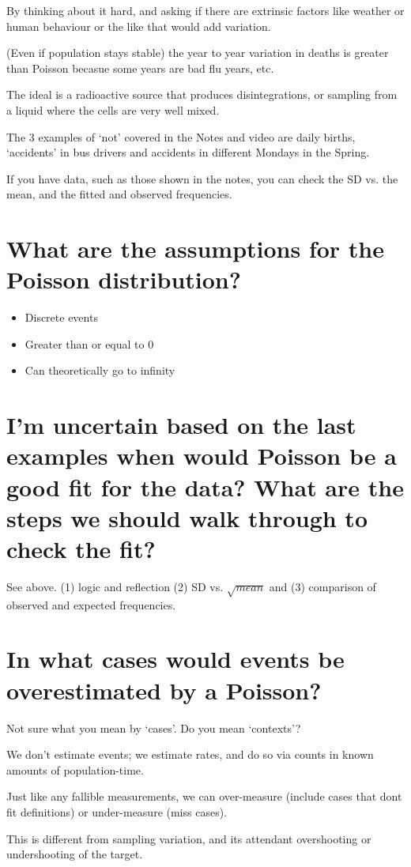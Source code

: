 \documentclass[landscape,twocolumn,letterpaper,9pt,reqno]{article}
\begin{document}
By thinking about it hard, and asking if there are extrinsic factors like weather or human behaviour or the like that would add variation.

(Even if population stays stable) the year to year variation in deaths is greater than Poisson becasue some years are bad flu years, etc. 

The ideal is a radioactive source that produces disintegrations, or sampling from a liquid where the cells are very well mixed.

The 3 examples of `not' covered in the Notes and video are daily births,
`accidents' in bus drivers and accidents in different Mondays in the Spring.

If you have data, such as those shown in the notes, you can check the SD vs. the mean, and the fitted and observed frequencies. 




\section{What are the assumptions for the Poisson distribution? }

\begin{itemize}
	\item Discrete events 
	\item Greater than or equal to 0
	\item Can theoretically go to infinity
\end{itemize}


\section{I'm uncertain based on the last examples when would Poisson be a good fit for the data? What are the steps we should walk through to check the fit?}

See above.  (1) logic and reflection (2) SD vs. $\sqrt{mean}$ and (3) comparison of observed and expected frequencies.

\section{In what cases would events be overestimated by a Poisson?}

Not sure what you mean by `cases'. Do you mean `contexts'? 

We don't estimate events; we estimate rates, and do so via counts in known amounts of population-time.

Just like any fallible measurements, we can over-measure (include cases that dont fit definitions) or under-measure (miss cases).

This is different from sampling variation, and its attendant overshooting or undershooting of the target. 
\end{document}
